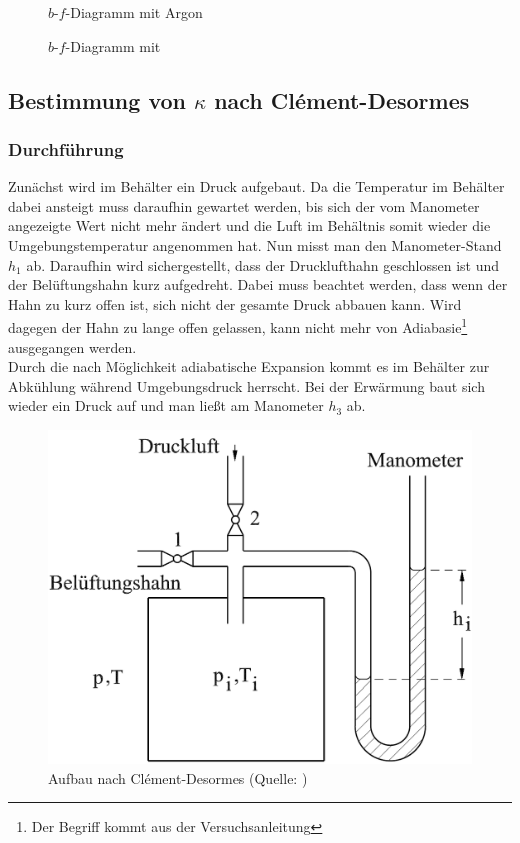 \begin{figure}[H]
\centering

\caption{$ b $-$ f $-Diagramm mit Argon}
\label{fig:ar}
\end{figure}

\begin{figure}[H]
\centering

\caption{$ b $-$ f $-Diagramm mit }
\label{fig:co2}
\end{figure}

\subsection{Bestimmung von $ \kappa $ nach Clément-Desormes}
\subsubsection{Durchführung}
Zunächst wird im Behälter ein Druck aufgebaut. Da die Temperatur im Behälter dabei ansteigt muss daraufhin gewartet werden, bis sich der vom Manometer angezeigte Wert nicht mehr ändert und die Luft im Behältnis somit wieder die Umgebungstemperatur angenommen hat.
Nun misst man den Manometer-Stand $ h_1 $ ab.
Daraufhin wird sichergestellt, dass der Drucklufthahn geschlossen ist und der Belüftungshahn kurz aufgedreht. Dabei muss beachtet werden, dass wenn der Hahn zu kurz offen ist, sich nicht der gesamte Druck abbauen kann. Wird dagegen der Hahn zu lange offen gelassen, kann nicht mehr von Adiabasie\footnote{Der Begriff kommt aus der Versuchsanleitung} ausgegangen werden.\\
Durch die nach Möglichkeit adiabatische Expansion kommt es im Behälter zur Abkühlung während Umgebungsdruck herrscht.
Bei der Erwärmung baut sich wieder ein Druck auf und man ließt am Manometer $ h_3 $ ab.
\begin{figure}[H]
\centering
\includegraphics[width=0.7\linewidth]{./bilder/versuch2}
\caption{Aufbau nach Clément-Desormes (Quelle: \cite{anleitung2015})}
\label{fig:aufbau2}
\end{figure}

